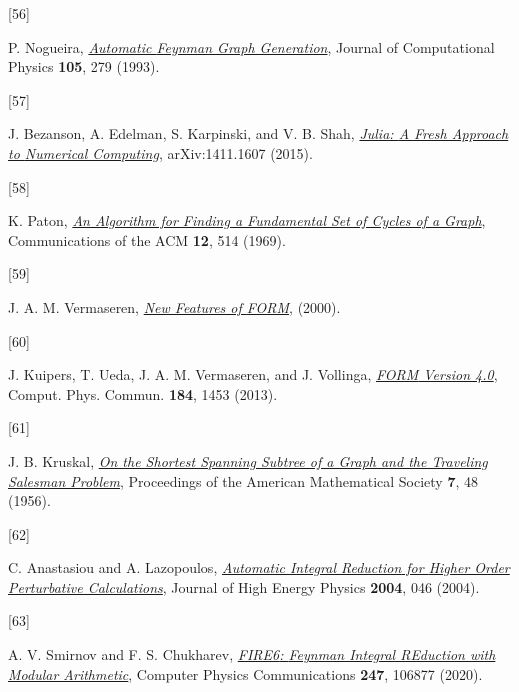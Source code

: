 \documentclass[
  10pt,
  a4paper,
  DIV=11,
  numbers=noendperiod,
  twoside]{scrreprt}
\newlength{\cslhangindent}
\newlength{\csllabelwidth}
\newlength{\cslentryspacingunit} %
\newenvironment{CSLReferences}[2] %
 {%
  \setlength{\parindent}{0pt}
  \ifodd #1
  \let\oldpar\par
  \def\par{\hangindent=\cslhangindent\oldpar}
  \fi
  \setlength{\parskip}{#2\cslentryspacingunit}
 }%
 {}
\newcommand{\CSLLeftMargin}[1]{\parbox[t]{\csllabelwidth}{#1}}
\newcommand{\CSLRightInline}[1]{\parbox[t]{\linewidth - \csllabelwidth}{#1}\break}
\DeclareRobustCommand{\[}{\begin{equation}}
\DeclareRobustCommand{\]}{\end{equation}}
\begin{document}
\begin{CSLReferences}{0}{0}
\leavevmode{}%
\CSLLeftMargin{{[}56{]} }%
\CSLRightInline{P. Nogueira,
\emph{\href{https://doi.org/10.1006/jcph.1993.1074}{Automatic {Feynman
Graph Generation}}}, Journal of Computational Physics \textbf{105}, 279
(1993).}

\leavevmode{}%
\CSLLeftMargin{{[}57{]} }%
\CSLRightInline{J. Bezanson, A. Edelman, S. Karpinski, and V. B. Shah,
\emph{\href{https://arxiv.org/abs/1411.1607}{Julia: {A Fresh Approach}
to {Numerical Computing}}}, arXiv:1411.1607 (2015).}

\leavevmode{}%
\CSLLeftMargin{{[}58{]} }%
\CSLRightInline{K. Paton,
\emph{\href{https://doi.org/10.1145/363219.363232}{An Algorithm for
Finding a Fundamental Set of Cycles of a Graph}}, Communications of the
ACM \textbf{12}, 514 (1969).}

\leavevmode{}%
\CSLLeftMargin{{[}59{]} }%
\CSLRightInline{J. A. M. Vermaseren,
\emph{\href{https://arxiv.org/abs/math-ph/0010025}{New Features of
{FORM}}}, (2000).}

\leavevmode{}%
\CSLLeftMargin{{[}60{]} }%
\CSLRightInline{J. Kuipers, T. Ueda, J. A. M. Vermaseren, and J.
Vollinga, \emph{\href{https://doi.org/10.1016/j.cpc.2012.12.028}{{FORM}
Version 4.0}}, Comput. Phys. Commun. \textbf{184}, 1453 (2013).}

\leavevmode{}%
\CSLLeftMargin{{[}61{]} }%
\CSLRightInline{J. B. Kruskal,
\emph{\href{https://doi.org/10.1090/S0002-9939-1956-0078686-7}{On the
Shortest Spanning Subtree of a Graph and the Traveling Salesman
Problem}}, Proceedings of the American Mathematical Society \textbf{7},
48 (1956).}

\leavevmode{}%
\CSLLeftMargin{{[}62{]} }%
\CSLRightInline{C. Anastasiou and A. Lazopoulos,
\emph{\href{https://doi.org/10.1088/1126-6708/2004/07/046}{Automatic
{Integral Reduction} for {Higher Order Perturbative Calculations}}},
Journal of High Energy Physics \textbf{2004}, 046 (2004).}

\leavevmode{}%
\CSLLeftMargin{{[}63{]} }%
\CSLRightInline{A. V. Smirnov and F. S. Chukharev,
\emph{\href{https://doi.org/10.1016/j.cpc.2019.106877}{{FIRE6}: {Feynman
Integral REduction} with {Modular Arithmetic}}}, Computer Physics
Communications \textbf{247}, 106877 (2020).}


\end{CSLReferences}
\end{document}
